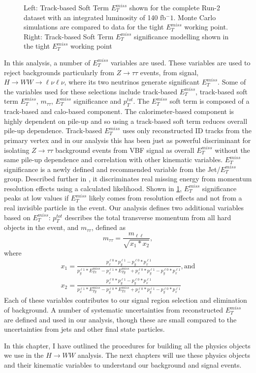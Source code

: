 \begin{figure}[!h]
\begin{minipage}[b]{0.45\textwidth}
  \end{minipage}
    \caption{ Left: Track-based Soft Term $E_T^{miss}$ shown for the complete Run-2 dataset with an integrated luminosity of 140 fb$^-1$. Monte Carlo simulations are compared to data for the tight $E_T^{miss}$ working point. Right: Track-based Soft Term $E_T^{miss}$ significance modelling shown in the tight $E_T^{miss}$ working point  \cite{JETEtmiss}}
    \label{fig:METPerf}
\end{figure}

In this analysis, a number of $E_T^{miss}$ variables are used. These variables are used to reject backgrounds particularly from $Z\rightarrow \tau\tau$ events, from signal, $H\rightarrow WW\rightarrow \ell\nu\ell\nu$, where its two neutrinos generate significant $E_T^{miss}$. Some of the variables used for these selections include track-based $E_T^{miss}$, track-based soft term $E_T^{miss}$, $m_{\tau\tau}$, $E_T^{miss}$ significance and $p_T^{tot}$. The $E_T^{miss}$ soft term is composed of a track-based and calo-based component. The calorimeter-based component is highly dependent on pile-up and so using a track-based soft term reduces overall pile-up dependence. Track-based $E_T^{miss}$ uses only reconstructed ID tracks from the primary vertex and in our analysis this has been just as powerful discriminant for isolating $Z\rightarrow \tau\tau$ background events from VBF signal as overall $E_T^{miss}$ without the same pile-up dependence and correlation with other kinematic variables. $E_T^{miss}$ significance is a newly defined and recommended variable from the Jet/$E_T^{miss}$group. Described further in \cite{METSig}, it discriminates real missing energy from momentum resolution effects using a calculated likelihood. Shown in \ref{fig:METPerf},  $E_T^{miss}$ significance peaks at low values if $E_T^{miss}$ likely comes from resolution effects and not from a real invisible particle in the event. Our analysis defines two additional variables based on $E_T^{miss}$: $p_T^{tot}$ describes the total transverse momentum from all hard objects in the event, and $m_{\tau\tau}$, defined as
\begin{equation}
m_{\tau\tau} = \frac{m_{\ell\ell}}{\sqrt{x_1*x_2}},
\end{equation}
where 
\begin{equation}
\begin{split}
x_1 = \frac{p^{\ell0}_x*p^{\ell1}_y-p^{\ell0}_y*p^{\ell1}_x}{p^{\ell1}_y*E_{Tx}^{miss}-p^{\ell1}_x*E_{Ty}^{miss}+p^{\ell0}_x*p^{\ell1}_y-p^{\ell0}_y*p^{\ell1}_x}, \text{and} \\
x_2 = \frac{p^{\ell0}_x*p^{\ell1}_y-p^{\ell0}_y*p^{\ell1}_x}{p^{\ell1}_x*E_{Ty}^{miss}-p^{\ell0}_y*E_{Tx}^{miss}+p^{\ell0}_x*p^{\ell1}_y-p^{\ell0}_y*p^{\ell1}_x}
\end{split}
\end{equation}
Each of these variables contributes to our signal region selection and elimination of background. A number of systematic uncertainties from reconstructed $E_T^{miss}$ are defined and used in our analysis, though these are small compared to the uncertainties from jets and other final state particles.

In this chapter, I have outlined the procedures for building all the physics objects we use in the $H\rightarrow WW$ analysis. The next chapters will use these physics objects and their kinematic variables to understand our background and signal events.
 
